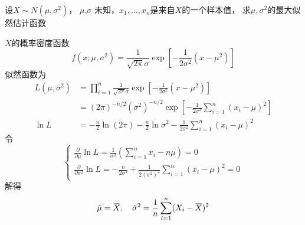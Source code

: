 \documentclass[11pt]{article}
\begin{document}
\begin{examplle}[]
设\(X\sim N(\mu,\sigma^2)\)， \(\mu\),\(\sigma\) 未知，\(x_1,\dots,x_n\)是来自\(X\)的一个样本值，
求\(\mu,\sigma^2\)的最大似然估计函数

\(X\)的概率密度函数
\begin{equation*}
f(x;\mu,\sigma^2)=\frac{1}{\sqrt{2\pi}\sigma}\exp\left[
-\frac{1}{2\sigma^2}(x-\mu^2)
\right]
\end{equation*}
似然函数为
\begin{align*}
L(\mu,\sigma^2)&=\prod_{i=1}^n\frac{1}{\sqrt{2\pi}\sigma}\exp\left[
-\frac{1}{2\sigma^2}(x-\mu^2)
\right]\\
&=(2\pi)^{-n/2}(\sigma^2)^{-n/2}\exp\left[
-\frac{1}{2\sigma^2}\sum_{i=1}^n(x_i-\mu)^2
\right]\\
\ln L&=-\frac{n}{2}\ln(2\pi)-\frac{n}{2}\ln\sigma^2-\frac{1}{2\sigma^2}\sum_{i=1}^n(x_i-\mu)^2
\end{align*}
令
\begin{equation*}
\begin{cases}
\frac{\partial}{\partial \mu}\ln L=\frac{1}{\sigma^2}(\sum_{i=1}^nx_i-n\mu)=0\\
\frac{\partial}{\partial\sigma^2}\ln L=
-\frac{n}{2\sigma^2}+\frac{1}{2(\sigma^2)^2}\sum_{i=1}^n(x_i-\mu)^2=0
\end{cases}
\end{equation*}
解得
\begin{equation*}
\hat{\mu}=\bbar{X},\quad\hat{\sigma}^2=\frac{1}{n}\sum_{i=1}^n(X_i-\bbar{X})^2
\end{equation*}
\end{examplle}
\end{document}
